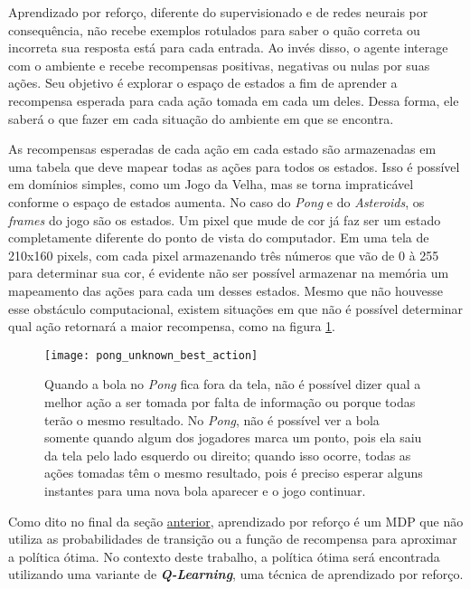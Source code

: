 Aprendizado por reforço, diferente do supervisionado e de redes neurais por consequência, não recebe exemplos rotulados para saber o quão correta ou incorreta sua resposta está para cada entrada.
Ao invés disso, o agente interage com o ambiente e recebe recompensas positivas, negativas ou nulas por suas ações.
Seu objetivo é explorar o espaço de estados a fim de aprender a recompensa esperada para cada ação tomada em cada um deles.
Dessa forma, ele saberá o que fazer em cada situação do ambiente em que se encontra.

As recompensas esperadas de cada ação em cada estado são armazenadas em uma tabela que deve mapear todas as ações para todos os estados.
Isso é possível em domínios simples, como um Jogo da Velha, mas se torna impraticável conforme o espaço de estados aumenta.
No caso do \textit{Pong} e do \textit{Asteroids}, os \textit{frames} do jogo são os estados.
Um pixel que mude de cor já faz ser um estado completamente diferente do ponto de vista do computador.
Em uma tela de 210x160 pixels, com cada pixel armazenando três números que vão de 0 à 255 para determinar sua cor, é evidente não ser possível armazenar na memória um mapeamento das ações para cada um desses estados.
Mesmo que não houvesse esse obstáculo computacional, existem situações em que não é possível determinar qual ação retornará a maior recompensa, como na figura \ref{fig:unknown_best_action}.

\begin{figure}[h!]
  \centering
  \texttt{[image: pong\_unknown\_best\_action]}
  \caption{Quando a bola no \textit{Pong} fica fora da tela, não é possível dizer qual a melhor ação a ser tomada por falta de informação ou porque todas terão o mesmo resultado. No \textit{Pong}, não é possível ver a bola somente quando algum dos jogadores marca um ponto, pois ela saiu da tela pelo lado esquerdo ou direito; quando isso ocorre, todas as ações tomadas têm o mesmo resultado, pois é preciso esperar alguns instantes para uma nova bola aparecer e o jogo continuar.}
  \label{fig:unknown_best_action}
\end{figure}

Como dito no final da seção \hyperref[sec:mdp]{anterior}, aprendizado por reforço é um MDP que não utiliza as probabilidades de transição ou a função de recompensa para aproximar a política ótima.
No contexto deste trabalho, a política ótima será encontrada utilizando uma variante de \textit{\textbf{Q-Learning}}, uma técnica de aprendizado por reforço.

